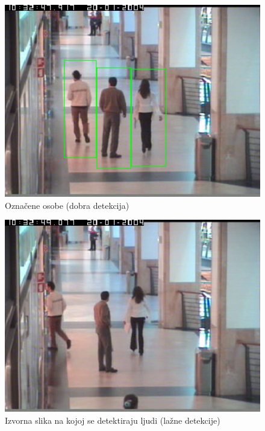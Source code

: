 \documentclass[times, utf8, seminar, numeric]{fer}
\begin{document}
\begin{figure}
\centering
\includegraphics[width=1\textwidth]{dobra_detekt.png}
\caption{Označene osobe (dobra detekcija)}
\label{dobra_detekt}
\end{figure}


\begin{figure}
\centering
\includegraphics[width=1\textwidth]{lazna_original.png}
\caption{Izvorna slika na kojoj se detektiraju ljudi (lažne detekcije)}
\label{lazna_original}
\end{figure}
\end{document}
